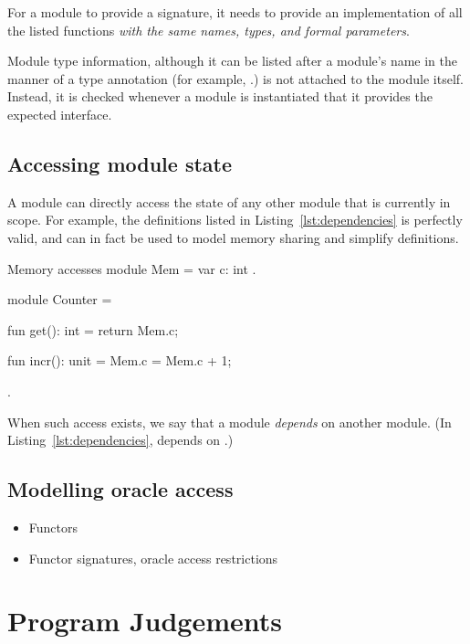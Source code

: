 For a module to provide a signature, it needs to provide an implementation of
all the listed functions \emph{with the same names, types, and formal
parameters}.


Module type information, although it can be listed after a module's name in the
manner of a type annotation (for example,
.) is not attached to the module itself.
Instead, it is checked whenever a module is instantiated that it provides the
expected interface.

\subsection{Accessing module state}
A module can directly access the state of any other module that is currently in
scope. For example, the definitions listed in Listing~\ref{lst:dependencies} is
perfectly valid, and can in fact be used to model memory sharing and simplify
definitions.

\begin{easycrypt}[label={lst:dependencies}]{Memory accesses}
module Mem = {
  var c: int
}.

module Counter = {
  fun get(): int = {
    return Mem.c;
  }

  fun incr(): unit = {
    Mem.c = Mem.c + 1;
  }
}.
\end{easycrypt}

When such access exists, we say that a module \emph{depends} on another module.
(In Listing~\ref{lst:dependencies},  depends on .)

\subsection{Modelling oracle access}

\begin{itemize}
\item Functors
\item Functor signatures, oracle access restrictions
\end{itemize}

\section{Program Judgements}

